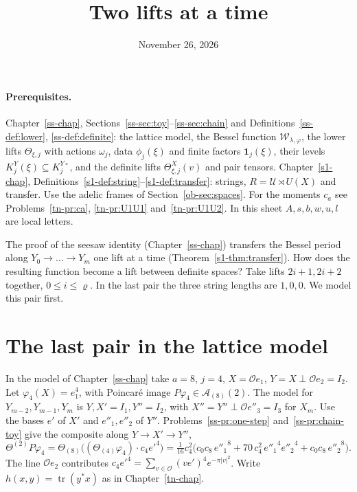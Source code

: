 \documentclass[reqno]{amsart}
\title{Two lifts at a time}
\author{}
\date{November 26, 2026}
\newcounter{chap}
\theoremstyle{definition}
\theoremstyle{plain}
\theoremstyle{remark}
\newcommand{\Ac}{\mathcal{A}}
\newcommand{\Uc}{\mathcal{U}}
\newcommand{\Wc}{\mathcal{W}}
\newcommand{\Oc}{\mathcal{O}}
\begin{document}
\maketitle
{}\label{chap}

\paragraph{Prerequisites.}
Chapter~\ref{ss-chap}, Sections~\ref{ss-sec:toy}--\ref{ss-sec:chain} and Definitions~\ref{ss-def:lower}, \ref{ss-def:definite}: the lattice model, the Bessel function \(\Wc_{\lambda,\varphi}\), the lower lifts \(\Theta_{\xi,j}\) with actions \(\omega_j\), data \(\phi_j(\xi)\) and finite factors \(\mathbf1_j(\xi)\), their levels \(K^Y_j(\xi)\subseteq K^{Y\circ}_j\), and the definite lifts \(\Theta^X_{\xi,j}(v)\) and pair tensors.  Chapter~\ref{s1-chap}, Definitions~\ref{s1-def:string}--\ref{s1-def:transfer}: strings, \(R=\Uc\rtimes U(X)\) and transfer.  Use the adelic frames of Section~\ref{ob-sec:spaces}.  For the moments \(c_a\) see Problems~\ref{tn-pr:ca}, \ref{tn-pr:U1U1} and~\ref{tn-pr:U1U2}.  In this sheet \(A,s,b,w,u,l\) are local letters.

The proof of the seesaw identity (Chapter~\ref{ss-chap}) transfers the Bessel period along \(Y_0\to\dots\to Y_m\) one lift at a time (Theorem~\ref{s1-thm:transfer}).  How does the resulting function become a lift between definite spaces?  Take lifts \(2i+1,2i+2\) together, \(0\le i\le\varrho\).  In the last pair the three string lengths are \(1,0,0\).  We model this pair first.


\section{The last pair in the lattice model}\label{sec:model}

In the model of Chapter~\ref{ss-chap} take \(a=8\), \(j=4\), \(X=\Oc e_1\), \(Y=X\perp\Oc e_2=I_2\).  Let \(\varphi_4(X)=e_1^4\), with Poincar\'e image \(P\varphi_4\in\Ac_{(8)}(2)\).  The model for \(Y_{m-2},Y_{m-1},Y_m\) is \(Y,X'=I_1,Y''=I_2\), with \(X''=Y''\perp\Oc e''_3=I_3\) for \(X_m\).  Use the bases \(e'\) of \(X'\) and \(e''_1,e''_2\) of \(Y''\).  Problems~\ref{ss-pr:one-step} and~\ref{ss-pr:chain-toy} give the composite along \(Y\to X'\to Y''\),
\begin{equation}\label{eq:model-lower}
  \Theta^{(2)}P\varphi_4 = \Theta_{(8)}\bigl((\Theta_{(4)}\varphi_4)\cdot c_4 e'^4\bigr) = \tfrac1{16}c_4^2\bigl(c_0c_8\,{e''_1}^8 + 70\,c_4^2\,{e''_1}^4{e''_2}^4 + c_0c_8\,{e''_2}^8\bigr) .
\end{equation}
The line \(\Oc e_2\) contributes \(c_4e'^4=\sum_{v\in\Oc}(ve')^4e^{-\pi|v|^2}\).  Write \(h(x,y)=\operatorname{tr}(y^*x)\) as in Chapter~\ref{tn-chap}.
\end{document}
